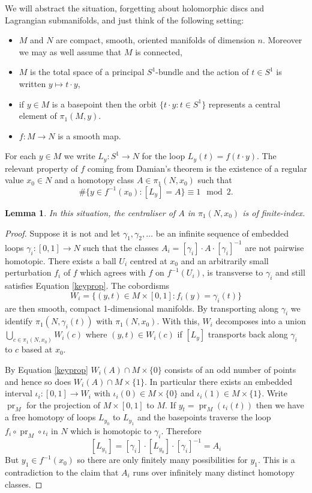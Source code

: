 \documentclass{amsart}
\newcommand{\OP}{\operatorname}
\newtheorem{lma}[thm]{Lemma}
\begin{document}
We will abstract the situation, forgetting about holomorphic discs and Lagrangian submanifolds, and just think of the following setting:
\begin{itemize}
\item $M$ and $N$ are compact, smooth, oriented manifolds of dimension $n$. Moreover we may as well assume that $M$ is connected,
\item $M$ is the total space of a principal $S^1$-bundle and the action of $t\in S^1$ is written $y\mapsto t\cdot y$,
\item if $y\in M$ is a basepoint then the orbit $\{t\cdot y:t\in S^1\}$ represents a central element of $\pi_1(M,y)$.
\item $f\colon M\to N$ is a smooth map.
\end{itemize}
For each $y\in M$ we write $L_y\colon S^1\to N$ for the loop $L_y(t)=f(t\cdot y)$. The relevant property of $f$ coming from Damian's theorem is the existence of a regular value $x_0\in N$ and a homotopy class $A\in\pi_1(N,x_0)$ such that
\begin{equation}\label{keyprop}\#\{y\in f^{-1}(x_0)\colon [L_y]=A\}\equiv 1\mod 2.\end{equation}
\begin{lma}\label{topo}
In this situation, the centraliser of $A$ in $\pi_1(N,x_0)$ is of finite-index.
\end{lma}
\begin{proof}
Suppose it is not and let $\gamma_1,\gamma_2,\ldots$ be an infinite sequence of embedded loops $\gamma_i\colon[0,1]\to N$ such that the classes $A_i=[\gamma_i]\cdot A\cdot[\gamma_i]^{-1}$ are not pairwise homotopic. There exists a ball $U_i$ centred at $x_0$ and an arbitrarily small perturbation $f_i$ of $f$ which agrees with $f$ on $f^{-1}(U_i)$, is transverse to $\gamma_i$ and still satisfies Equation \eqref{keyprop}. The cobordisms
\[W_i=\{(y,t)\in M\times[0,1]\colon f_i(y)=\gamma_i(t)\}\]
are then smooth, compact 1-dimensional manifolds. By transporting along $\gamma_i$ we identify $\pi_1(N,\gamma_i(t))$ with $\pi_1(N,x_0)$. With this, $W_i$ decomposes into a union $\bigcup_{c\in\pi_1(N,x_0)}W_i(c)$ where $(y,t)\in W_i(c)$ if $[L_y]$ transports back along $\gamma_i$ to $c$ based at $x_0$.

By Equation \eqref{keyprop} $W_i(A)\cap M\times\{0\}$ consists of an odd number of points and hence so does $W_i(A)\cap M\times\{1\}$. In particular there exists an embedded interval $\iota_i\colon [0,1]\to W_i$ with $\iota_i(0)\in M\times\{0\}$ and $\iota_i(1)\in M\times\{1\}$. Write $\OP{pr}_M$ for the projection of $M\times[0,1]$ to $M$. If $y_t=\OP{pr}_M(\iota_i(t))$ then we have a free homotopy of loops $L_{y_0}$ to $L_{y_1}$ and the basepoints traverse the loop $f_i\circ\OP{pr}_M\circ\iota_i$ in $N$ which is homotopic to $\gamma_i$. Therefore
\[[L_{y_1}]=[\gamma_i]\cdot[L_{y_0}]\cdot[\gamma_i]^{-1}=A_i\]
But $y_1\in f^{-1}(x_0)$ so there are only finitely many possibilities for $y_1$. This is a contradiction to the claim that $A_i$ runs over infinitely many distinct homotopy classes.
\end{proof}
\end{document}
